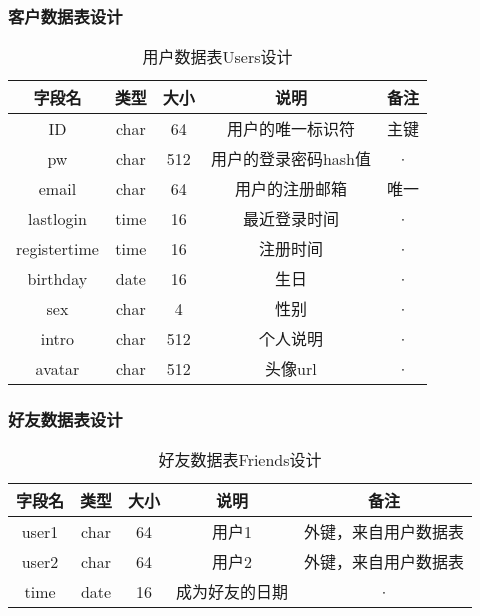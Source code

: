 \subsubsection{客户数据表设计}
\begin{table}[htbp]
\centering
\caption{用户数据表Users设计} \label{tab:client-database}
\begin{tabular}{|c|c|c|c|c|}
    \hline
    字段名 & 类型 & 大小 & 说明 & 备注 \\
    \hline
    ID & char & 64 & 用户的唯一标识符 & 主键 \\
    \hline
    pw & char & 512 & 用户的登录密码hash值 & · \\
    \hline
    email & char & 64 & 用户的注册邮箱 & 唯一 \\
    \hline
    lastlogin & time & 16 & 最近登录时间 & · \\
    \hline
    registertime & time & 16 & 注册时间 & · \\
    \hline
    birthday & date & 16 & 生日 & · \\
    \hline
    sex & char & 4 & 性别 & · \\
    \hline
    intro   & char & 512  & 个人说明 & · \\
    \hline
    avatar  & char & 512  & 头像url & · \\
	\hline
\end{tabular}
\end{table}


\subsubsection{好友数据表设计}
\begin{table}[htbp]
\centering
\caption{好友数据表Friends设计} \label{tab:friend-database}
\begin{tabular}{|c|c|c|c|c|}
    \hline
    字段名 & 类型 & 大小 & 说明 & 备注 \\
    \hline
    user1 & char & 64 & 用户1 & 外键，来自用户数据表 \\
    \hline
    user2 & char & 64 & 用户2 & 外键，来自用户数据表 \\
    \hline
    time & date & 16 & 成为好友的日期 & · \\
    \hline
\end{tabular}
\end{table}


